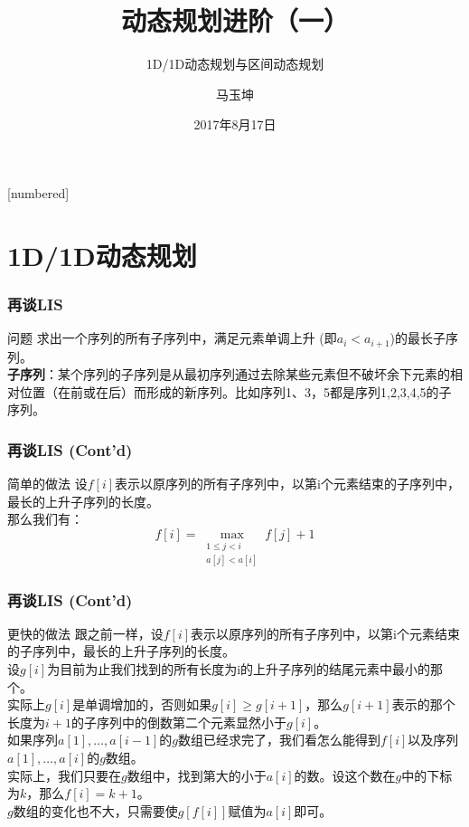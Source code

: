 \documentclass[hyperref={unicode=true}]{beamer}
\theoremstyle{definition}
\theoremstyle{proof}
\begin{document}
[numbered]
\renewcommand\figurename{图}
\renewcommand\tablename{表}
\renewcommand\contentsname{\centering 目录}


\title{动态规划进阶（一）}
\subtitle{1D/1D动态规划与区间动态规划}
\author{马玉坤}
\date{2017年8月17日}

\begin{frame}\titlepage\end{frame}

\section{1D/1D动态规划}

\begin{frame}\frametitle{再谈LIS}
  \begin{block}{问题}
    求出一个序列的所有子序列中，满足元素单调上升 (即$a_i<a_{i+1}$)的最长子序列。\\
    {\bf 子序列}：某个序列的子序列是从最初序列通过去除某些元素但不破坏余下元素的相对位置（在前或在后）而形成的新序列。比如序列{1}、{3，5}都是序列{1,2,3,4,5}的子序列。
  \end{block}
\end{frame}
\begin{frame}\frametitle{再谈LIS (Cont'd)}
  \begin{alertblock}{简单的做法}
    设$f[i]$表示以原序列的所有子序列中，以第i个元素结束的子序列中，最长的上升子序列的长度。\\
    那么我们有：
    \[f[i] = \max_{\substack{1 \leq j < i\\ a[j] < a[i]}}f[j]+1\]
  \end{alertblock}
\end{frame}
\begin{frame}\frametitle{再谈LIS (Cont'd)}
  \begin{exampleblock}{更快的做法}
    跟之前一样，设$f[i]$表示以原序列的所有子序列中，以第i个元素结束的子序列中，最长的上升子序列的长度。\\
    设$g[i]$为目前为止我们找到的所有长度为i的上升子序列的结尾元素中最小的那个。\\
    实际上$g[i]$是单调增加的，否则如果$g[i]\geq g[i+1]$，那么$g[i+1]$表示的那个长度为$i+1$的子序列中的倒数第二个元素显然小于$g[i]$。\\
    \pause{}如果序列$a[1],\ldots,a[i-1]$的$g$数组已经求完了，我们看怎么能得到$f[i]$以及序列$a[1],\ldots,a[i]$的$g$数组。\\
    实际上，我们只要在$g$数组中，找到第大的小于$a[i]$的数。设这个数在$g$中的下标为$k$，那么$f[i]=k+1$。\\
    $g$数组的变化也不大，只需要使$g[f[i]]$赋值为$a[i]$即可。
  \end{exampleblock}
\end{frame}
\end{document}
